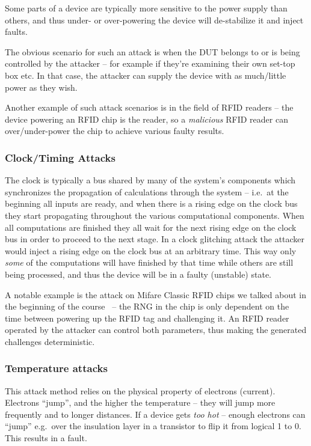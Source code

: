 Some parts of a device are typically more sensitive to the power supply than
others, and thus under- or over-powering the device will de-stabilize it and
inject faults.

The obvious scenario for such an attack is when the DUT belongs to or is being
controlled by the attacker -- for example if they're examining their own set-top
box etc. In that case, the attacker can supply the device with as much/little
power as they wish.

Another example of such attack scenarios is in the field of RFID readers -- the
device powering an RFID chip is the reader, so a \emph{malicious} RFID reader
can over/under-power the chip to achieve various faulty results.

\subsubsection{Clock/Timing Attacks}\label{subsubsec:clock_timing_attacks}
The clock is typically a bus shared by many of the system's components which
synchronizes the propagation of calculations through the system -- i.e.\ at the
beginning all inputs are ready, and when there is a rising edge on the clock bus
they start propagating throughout the various computational components. When all
computations are finished they all wait for the next rising edge on the clock
bus in order to proceed to the next stage. In a clock glitching attack the
attacker would inject a rising edge on the clock bus at an arbitrary time. This
way only \emph{some} of the computations will have finished by that time while
others are still being processed, and thus the device will be in a faulty
(unstable) state.

A notable example is the attack on Mifare Classic RFID chips we talked about in
the beginning of the course~\cite{nohl2008} -- the RNG in the chip is only
dependent on the time between powering up the RFID tag and challenging it. An
RFID reader operated by the attacker can control both parameters, thus making
the generated challenges deterministic.

\subsubsection{Temperature attacks}\label{subsubsec:temperature_attacks}
This attack method relies on the physical property of electrons (current).
Electrons ``jump'', and the higher the temperature -- they will jump more
frequently and to longer distances. If a device gets \emph{too hot} -- enough
electrons can ``jump'' e.g.\ over the insulation layer in a transistor to flip
it from logical 1 to 0. This results in a fault.

